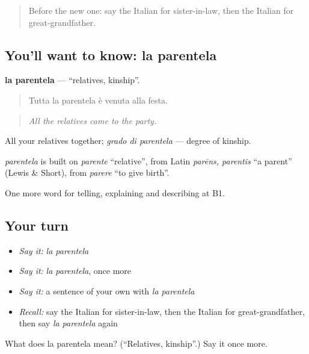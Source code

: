 \begin{quote}
Before the new one: say the Italian for sister-in-law, then the Italian for great-grandfather.
\end{quote}

\subsection*{You'll want to know: la parentela}
\textbf{la parentela} — \textquotedblleft{}relatives, kinship\textquotedblright{}.

\begin{quote}
Tutta la parentela è venuta alla festa.
\end{quote}

\begin{quote}
\emph{All the relatives came to the party.}
\end{quote}

All your relatives together; \emph{grado di parentela} — degree of kinship.

\begin{cousinweb}
\emph{parentela} is built on \emph{parente} \textquotedblleft{}relative\textquotedblright{}, from Latin \emph{parēns, parentis} \textquotedblleft{}a parent\textquotedblright{} (Lewis \& Short), from \emph{parere} \textquotedblleft{}to give birth\textquotedblright{}.
\end{cousinweb}

\begin{grammarlens}[title={What you've built}]
One more word for telling, explaining and describing at B1.
\end{grammarlens}

\subsection*{Your turn}
\begin{itemize}
\raggedright
  \item \emph{Say it:} \emph{la parentela}
  \item \emph{Say it:} \emph{la parentela}, once more
  \item \emph{Say it:} a sentence of your own with \emph{la parentela}
  \item \emph{Recall:} say the Italian for sister-in-law, then the Italian for great-grandfather, then say \emph{la parentela} again
\end{itemize}

\begin{tcolorbox}[breakable,colback=teal!4,colframe=teal!35!black,title={Before you move on}]
What does la parentela mean? (\textquotedblleft{}Relatives, kinship\textquotedblright{}.) Say it once more.
\end{tcolorbox}
